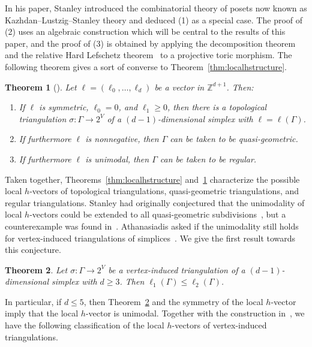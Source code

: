 \documentclass[11pt]{article}
\newtheorem{theo}{Theorem}[section]
\theoremstyle{definition}
\numberwithin{equation}{section}
\numberwithin{equation}{section}
\begin{document}
In his paper, Stanley introduced the combinatorial theory of posets now known as Kazhdan--Lustzig--Stanley theory and deduced (1) as a special case.
The proof of (2) uses an algebraic construction which will be central to the results of this paper, and the proof of (3) is obtained by applying the decomposition theorem and the relative Hard Lefschetz theorem~\cite{BBDG} to a projective toric morphism. 
The following theorem gives a sort of converse to Theorem~\ref{thm:localhstructure}. 

\begin{theo}[\cite{ChanLocal,JKSS}]\label{thm:construction}
Let $\ell = (\ell_0, \dotsc, \ell_d)$ be a vector in $\mathbb{Z}^{d+1}$. Then:
\begin{enumerate}
\item If $\ell$ is symmetric, $\ell_0 = 0$, and $\ell_1 \ge 0$, then there is a topological triangulation $\sigma \colon \Gamma \to 2^V$ of a $(d-1)$-dimensional simplex with $\ell = \ell(\Gamma)$. 
\item If furthermore $\ell$ is nonnegative, then $\Gamma$ can be taken to be quasi-geometric. 
\item If furthermore $\ell$ is unimodal, then $\Gamma$ can be taken to be regular. 
\end{enumerate}
\end{theo}

Taken together, Theorems~\ref{thm:localhstructure} and~\ref{thm:construction} characterize the possible local $h$-vectors of topological triangulations, quasi-geometric triangulations, and regular triangulations. 
Stanley had originally conjectured that the unimodality of local $h$-vectors could be extended to all quasi-geometric subdivisions~\cite[Conjecture 5.4]{Stanleylocalh}, but a counterexample 
was found in~\cite[Example 3.4]{AthanasiadisFlag}. Athanasiadis asked if the unimodality still holds for vertex-induced triangulations of simplices~\cite[Question 3.5]{AthanasiadisFlag}. We give the first result towards this conjecture. 

\begin{theo}\label{thm:combineq}
Let $\sigma \colon \Gamma \to 2^V$ be a vertex-induced triangulation of a $(d-1)$-dimensional simplex with $d \ge 3$. Then $\ell_1(\Gamma) \le \ell_2(\Gamma)$. 
\end{theo}

In particular, if $d \le 5$, then Theorem~\ref{thm:combineq} and the symmetry of the local $h$-vector imply that the local $h$-vector is unimodal. Together with the construction in~\cite{ChanLocal}, we have the following classification of the local $h$-vectors of vertex-induced triangulations. 
\end{document}
